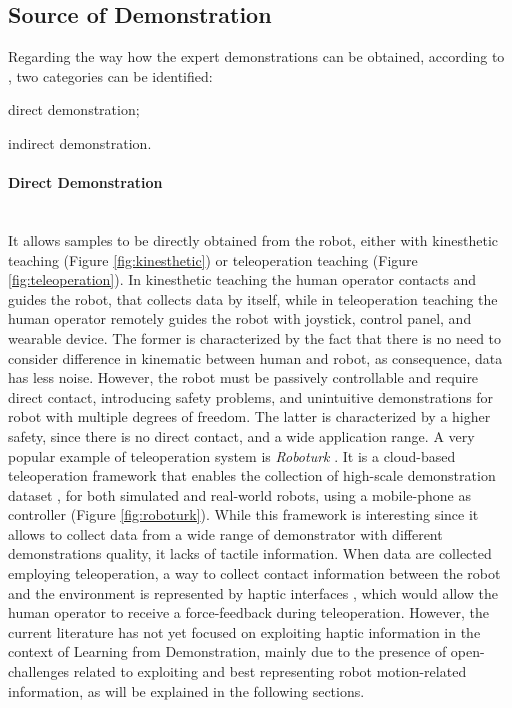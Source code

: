 \subsection{Source of Demonstration}
\label{sec:source_of_demonstration}
Regarding the way how the expert demonstrations can be obtained, according to \cite{fang2019survey}, two categories can be identified: \begin{enumerate*}[label=\textbf{(\alph*)}]
    \item direct demonstration; 
    \item indirect demonstration.
\end{enumerate*}

\paragraph{Direct Demonstration}  \mbox{} \\
\noindent It allows samples to be directly obtained from the robot, either with kinesthetic teaching (Figure \ref{fig:kinesthetic}) or teleoperation teaching (Figure \ref{fig:teleoperation}). In kinesthetic teaching the human operator contacts and guides the robot, that collects data by itself, while in teleoperation teaching the human operator remotely guides the robot with joystick, control panel, and wearable device. 
The former is characterized by the fact that there is no need to consider difference in kinematic between human and robot, as consequence, data has less noise. However, the robot must be passively controllable and require direct contact, introducing safety problems, and unintuitive demonstrations for robot with multiple degrees of freedom.
The latter is characterized by a higher safety, since there is no direct contact, and a wide application range.
A very popular example of teleoperation system is \textit{Roboturk} \cite{mandlekar2018roboturk}. It is a cloud-based teleoperation framework that enables the collection of high-scale demonstration dataset \cite{mandlekar2019scaling,mandlekar2022matters}, for both simulated and real-world robots, using a mobile-phone as controller (Figure \ref{fig:roboturk}). While this framework is interesting since it allows to collect data from a wide range of demonstrator with different demonstrations quality, it lacks of tactile information. When data are collected employing teleoperation, a way to collect contact information between the robot and the environment is represented by haptic interfaces \cite{cyberglove,touch}, which would allow the human operator to receive a force-feedback during teleoperation. However, the current literature has not yet focused on exploiting haptic information in the context of Learning from Demonstration, mainly due to the presence of open-challenges related to exploiting and best representing robot motion-related information, as will be explained in the following sections.

